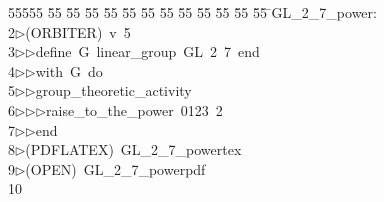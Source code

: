 %
%
\begin{tabbing}
55555 \= 55 \= 55 \= 55 \= 55 \= 55 \= 55 \= 55 \= 55 \= 55 \= 55 \= 55 \= 55 \= \>GL\_2\_7\_power:\\[0pt]
2\>$\triangleright$\>(ORBITER)\ v\ 5\ \\[0pt]
3\>$\triangleright$\>$\triangleright$\>define\ G\ linear\_group\ GL\ 2\ 7\ end\ \\[0pt]
4\>$\triangleright$\>$\triangleright$\>with\ G\ do\ \\[0pt]
5\>$\triangleright$\>$\triangleright$\>group\_theoretic\_activity\ \\[0pt]
6\>$\triangleright$\>$\triangleright$\>$\triangleright$\>raise\_to\_the\_power\ 0123\ 2\ \\[0pt]
7\>$\triangleright$\>$\triangleright$\>end\\[0pt]
8\>$\triangleright$\>(PDFLATEX)\ GL\_2\_7\_powertex\\[0pt]
9\>$\triangleright$\>(OPEN)\ GL\_2\_7\_powerpdf\\[0pt]
10\>\end{tabbing}
